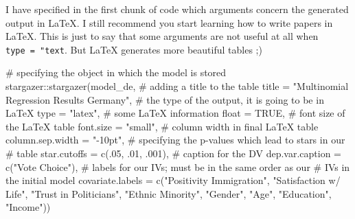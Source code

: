 \documentclass[
  letterpaper,
  DIV=11,
  numbers=noendperiod]{scrreprt}
\newenvironment{Shaded}{\begin{snugshade}}{\end{snugshade}}
\newcommand{\AttributeTok}[1]{\textcolor[rgb]{0.40,0.45,0.13}{#1}}
\newcommand{\CommentTok}[1]{\textcolor[rgb]{0.37,0.37,0.37}{#1}}
\newcommand{\ConstantTok}[1]{\textcolor[rgb]{0.56,0.35,0.01}{#1}}
\newcommand{\DecValTok}[1]{\textcolor[rgb]{0.68,0.00,0.00}{#1}}
\newcommand{\FunctionTok}[1]{\textcolor[rgb]{0.28,0.35,0.67}{#1}}
\newcommand{\NormalTok}[1]{\textcolor[rgb]{0.00,0.23,0.31}{#1}}
\newcommand{\SpecialCharTok}[1]{\textcolor[rgb]{0.37,0.37,0.37}{#1}}
\newcommand{\StringTok}[1]{\textcolor[rgb]{0.13,0.47,0.30}{#1}}
\begin{document}
I have specified in the first chunk of code which arguments concern the
generated output in LaTeX. I still recommend you start learning how to
write papers in LaTeX. This is just to say that some arguments are not
useful at all when \texttt{type\ =\ "text}. But LaTeX generates more
beautiful tables ;)

\begin{Shaded}
\begin{Highlighting}[]
\CommentTok{\# specifying the object in which the model is stored}
\NormalTok{stargazer}\SpecialCharTok{::}\FunctionTok{stargazer}\NormalTok{(model\_de,}
                     \CommentTok{\# adding a title to the table}
                     \AttributeTok{title =} \StringTok{"Multinomial Regression Results Germany"}\NormalTok{,}
                     \CommentTok{\# the type of the output, it is going to be in LaTeX}
                     \AttributeTok{type =} \StringTok{"latex"}\NormalTok{,}
                     \CommentTok{\# some LaTeX information}
                     \AttributeTok{float =} \ConstantTok{TRUE}\NormalTok{,}
                     \CommentTok{\# font size of the LaTeX table}
                     \AttributeTok{font.size =} \StringTok{"small"}\NormalTok{, }
                     \CommentTok{\# column width in final LaTeX table}
                     \AttributeTok{column.sep.width =} \StringTok{"{-}10pt"}\NormalTok{,}
                     \CommentTok{\# specifying the p{-}values which lead to stars in our}
                     \CommentTok{\# table}
                     \AttributeTok{star.cutoffs =} \FunctionTok{c}\NormalTok{(.}\DecValTok{05}\NormalTok{, .}\DecValTok{01}\NormalTok{, .}\DecValTok{001}\NormalTok{), }
                     \CommentTok{\# caption for the DV}
                     \AttributeTok{dep.var.caption =} \FunctionTok{c}\NormalTok{(}\StringTok{"Vote Choice"}\NormalTok{),}
                     \CommentTok{\# labels for our IVs; must be in the same order as our}
                     \CommentTok{\# IVs in the initial model}
                     \AttributeTok{covariate.labels =} \FunctionTok{c}\NormalTok{(}\StringTok{"Positivity Immigration"}\NormalTok{,}
                             \StringTok{"Satisfaction w/ Life"}\NormalTok{, }\StringTok{"Trust in Politicians"}\NormalTok{,}
                             \StringTok{"Ethnic Minority"}\NormalTok{, }\StringTok{"Gender"}\NormalTok{, }\StringTok{"Age"}\NormalTok{, }\StringTok{"Education"}\NormalTok{, }
                             \StringTok{"Income"}\NormalTok{))}


\end{Highlighting}
\end{Shaded}
\end{document}
